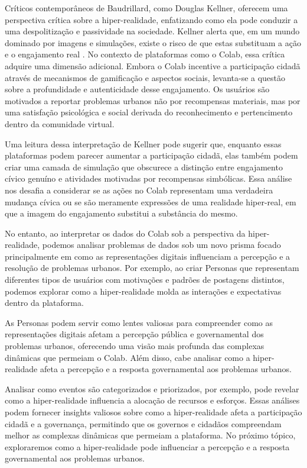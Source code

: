 Críticos contemporâneos de Baudrillard, como Douglas Kellner, oferecem uma perspectiva crítica sobre a hiper-realidade, enfatizando como ela pode conduzir a uma despolitização e passividade na sociedade. Kellner alerta que, em um mundo dominado por imagens e simulações, existe o risco de que estas substituam a ação e o engajamento real \cite{1995_Kellner_BOOK}. No contexto de plataformas como o Colab, essa crítica adquire uma dimensão adicional. Embora o Colab incentive a participação cidadã através de mecanismos de gamificação e aspectos sociais, levanta-se a questão sobre a profundidade e autenticidade desse engajamento. Os usuários são motivados a reportar problemas urbanos não por recompensas materiais, mas por uma satisfação psicológica e social derivada do reconhecimento e pertencimento dentro da comunidade virtual.

Uma leitura dessa interpretação de Kellner pode sugerir que, enquanto essas plataformas podem parecer aumentar a participação cidadã, elas também podem criar uma camada de simulação que obscurece a distinção entre engajamento cívico genuíno e atividades motivadas por recompensas simbólicas. Essa análise nos desafia a considerar se as ações no Colab representam uma verdadeira mudança cívica ou se são meramente expressões de uma realidade hiper-real, em que a imagem do engajamento substitui a substância do mesmo.

No entanto, ao interpretar os dados do Colab sob a perspectiva da hiper-realidade, podemos analisar problemas de dados sob um novo prisma focado principalmente em como as representações digitais influenciam a percepção e a resolução de problemas urbanos. Por exemplo, ao criar Personas que representam diferentes tipos de usuários com motivações e padrões de postagens distintos, podemos explorar como a hiper-realidade molda as interações e expectativas dentro da plataforma. 

As Personas podem servir como lentes valiosas para compreender como as representações digitais afetam a percepção pública e governamental dos problemas urbanos, oferecendo uma visão mais profunda das complexas dinâmicas que permeiam o Colab. Além disso, cabe analisar como a hiper-realidade afeta a percepção e a resposta governamental aos problemas urbanos. 

Analisar como eventos são categorizados e priorizados, por exemplo, pode revelar como a hiper-realidade influencia a alocação de recursos e esforços. Essas análises podem fornecer insights valiosos sobre como a hiper-realidade afeta a participação cidadã e a governança, permitindo que os governos e cidadãos compreendam melhor as complexas dinâmicas que permeiam a plataforma. No próximo tópico, exploraremos como a hiper-realidade pode influenciar a percepção e a resposta governamental aos problemas urbanos.

